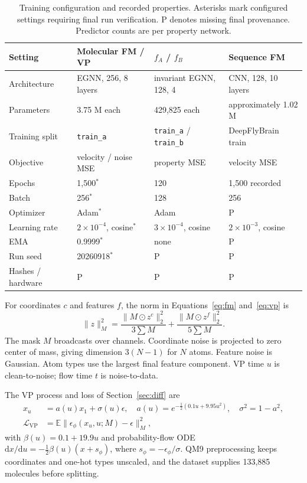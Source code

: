 \documentclass{article}
\newcommand{\pend}{\textcolor{black!60}{\textsf{P}}}
\begin{document}
\begin{table}[!htbp]
\centering\small
\caption{Training configuration and recorded properties. Asterisks mark configured settings requiring final run verification. P denotes missing final provenance. Predictor counts are per property network.}
\label{tab:training}
\begin{tabular}{llll}
\toprule
Setting & Molecular FM / VP & $f_A$ / $f_B$ & Sequence FM\\
\midrule
Architecture & EGNN, 256, 8 layers & invariant EGNN, 128, 4 & CNN, 128, 10 layers\\
Parameters & 3.75 M each & 429{,}825 each & approximately 1.02 M\\
Training split & \texttt{train\_a} & \texttt{train\_a} / \texttt{train\_b} & DeepFlyBrain train\\
Objective & velocity / noise MSE & property MSE & velocity MSE\\
Epochs & 1{,}500$^*$ & 120 & 1{,}500 recorded\\
Batch & 256$^*$ & 128 & 256\\
Optimizer & Adam$^*$ & Adam & \pend\\
Learning rate & $2\times10^{-4}$, cosine$^*$ & $3\times10^{-4}$, cosine & $2\times10^{-3}$, cosine\\
EMA & 0.9999$^*$ & none & \pend\\
Run seed & 20260918$^*$ & \pend & \pend\\
Hashes / hardware & \pend & \pend & \pend\\
\bottomrule
\end{tabular}
\end{table}

For coordinates $c$ and features $f$, the norm in Equations~\eqref{eq:fm} and~\eqref{eq:vp} is
\[
\|z\|_M^2=\frac{\|M\odot z^c\|_2^2}{3\sum M}+\frac{\|M\odot z^f\|_2^2}{5\sum M}.
\]
The mask $M$ broadcasts over channels. Coordinate noise is projected to zero center of mass, giving dimension $3(N-1)$ for $N$ atoms. Feature noise is Gaussian. Atom types use the largest final feature component. VP time $u$ is clean-to-noise; flow time $t$ is noise-to-data.

The VP process and loss of Section~\ref{sec:diff} are
\begin{equation}
\begin{aligned}
x_u&=a(u)x_1+\sigma(u)\epsilon,\quad a(u)=e^{-\frac12(0.1u+9.95u^2)},\quad \sigma^2=1-a^2,\\
\mathcal L_{\mathrm{VP}}&=\mathbb E\|\epsilon_\phi(x_u,u;M)-\epsilon\|_M^2,
\end{aligned}
\label{eq:vp}
\end{equation}
with $\beta(u)=0.1+19.9u$ and probability-flow ODE $\mathrm dx/\mathrm du=-\tfrac12\beta(u)(x+s_\phi)$, where $s_\phi=-\epsilon_\phi/\sigma$. QM9 preprocessing keeps coordinates and one-hot types unscaled, and the dataset supplies 133{,}885 molecules before splitting.
\end{document}
